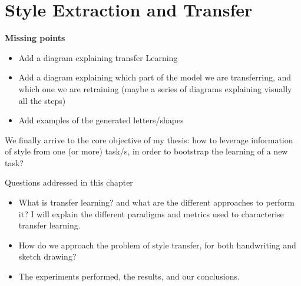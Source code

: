 \chapter{Style Extraction and Transfer} \label{ch:seat}
\minitoc%

\textbf{Missing points}
\begin{itemize}
  \item Add a diagram explaining transfer Learning
  \item Add a diagram explaining which part of the model we are transferring, and which one we are retraining (maybe a series of diagrams explaining visually all the steps)
  \item Add examples of the generated letters/shapes
\end{itemize}

\par We finally arrive to the core objective of my thesis: how to leverage information of style from one (or more) task/s, in order to bootstrap the learning of a new task?

\begin{mdframed}[backgroundcolor=blue!20]
  \begin{center}
    Questions addressed in this chapter
  \end{center}

  \begin{itemize}
    \item What is transfer learning? and what are the different approaches to perform it? I will explain the different paradigms and metrics used to characterise transfer learning.
    \item How do we approach the problem of style transfer, for both handwriting and sketch drawing?
    \item The experiments performed, the results, and our conclusions.
  \end{itemize}
\end{mdframed}

\clearpage


